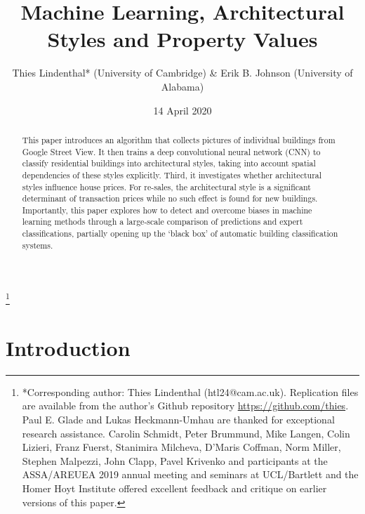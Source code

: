 \documentclass[]{article}
\title{Machine Learning, Architectural Styles and Property Values}
\author{Thies Lindenthal* (University of Cambridge) \& Erik B. Johnson
(University of Alabama)}
\date{14 April 2020}
\let\rmarkdownfootnote\footnote%
\def\footnote{\protect\rmarkdownfootnote}
\begin{document}
\maketitle
\begin{abstract}
This paper introduces an algorithm that collects pictures of individual
buildings from Google Street View. It then trains a deep convolutional
neural network (CNN) to classify residential buildings into
architectural styles, taking into account spatial dependencies of these
styles explicitly. Third, it investigates whether architectural styles
influence house prices. For re-sales, the architectural style is a
significant determinant of transaction prices while no such effect is
found for new buildings. Importantly, this paper explores how to detect
and overcome biases in machine learning methods through a large-scale
comparison of predictions and expert classifications, partially opening
up the `black box' of automatic building classification systems.
\end{abstract}

\let\svthefootnote\thefootnote
\let\thefootnote\relax

\footnote{{*Corresponding author: Thies Lindenthal (htl24@cam.ac.uk). Replication files are available from the author's Github repository \href{https://github.com/thies}{https://github.com/thies}. Paul E. Glade and Lukas Heckmann-Umhau are thanked for exceptional research assistance. Carolin Schmidt, Peter Brummund, Mike Langen, Colin Lizieri, Franz Fuerst, Stanimira Milcheva, D'Maris Coffman, Norm Miller, Stephen Malpezzi, John Clapp, Pavel Krivenko and participants at the ASSA/AREUEA 2019 annual meeting and seminars at UCL/Bartlett and the Homer Hoyt Institute offered excellent feedback and critique on earlier versions of this paper.}}

\addtocounter{footnote}{-1}\let\thefootnote\svthefootnote

\newpage

\hypertarget{introduction}{%
\section{Introduction}\label{introduction}}
\end{document}
